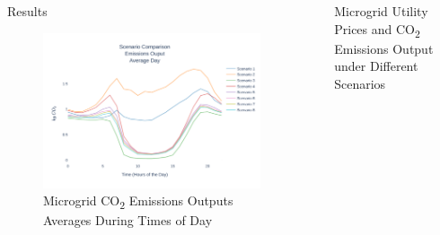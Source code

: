 \documentclass[final, 20 pt]{beamer}
\newlength{\sepwid}
\newlength{\onecolwid}
\begin{document}
\begin{frame}[t]
\begin{columns}[t]
\begin{column}{\onecolwid}
\begin{block}{Results}
	\begin{figure}
		\centering
		\includegraphics[width=\linewidth]{Fig/emissions_scenario_comparison_run_3}
		\caption{Microgrid CO\textsubscript{2} Emissions Outputs Averages During Times of Day}
		\label{fig:emissionsscenariocomparison}
	\end{figure}

\end{block}


\end{column} %


\begin{column}{\sepwid}\end{column} %

\begin{column}{\onecolwid} %
\begin{block}{}
	\begin{table}
		\caption{Microgrid Utility Prices and CO\textsubscript{2} Emissions Output under Different Scenarios}
		\centering
		\footnotesize
		
		\label{tab:emissions}
	\end{table}
\end{block}



\end{column}
\end{columns}
\end{frame}
\end{document}

